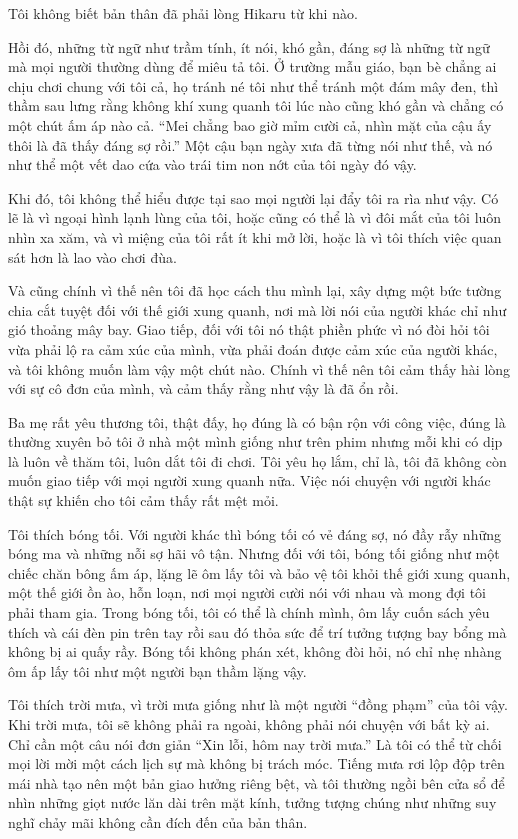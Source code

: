 {Tôi không biết bản thân đã phải lòng Hikaru từ khi nào.

Hồi đó, những từ ngữ như trầm tính, ít nói, khó gần, đáng sợ là những từ
ngữ mà mọi người thường dùng để miêu tả tôi. Ở trường mẫu giáo, bạn bè
chẳng ai chịu chơi chung với tôi cả, họ tránh né tôi như thể tránh một
đám mây đen, thì thầm sau lưng rằng không khí xung quanh tôi lúc nào
cũng khó gần và chẳng có một chút ấm áp nào cả. ``Mei chẳng bao giờ mỉm
cười cả, nhìn mặt của cậu ấy thôi là đã thấy đáng sợ rồi.'' Một cậu bạn
ngày xưa đã từng nói như thế, và nó như thể một vết dao cứa vào trái tim
non nớt của tôi ngày đó vậy.

Khi đó, tôi không thể hiểu được tại sao mọi người lại đẩy tôi ra rìa như
vậy. Có lẽ là vì ngoại hình lạnh lùng của tôi, hoặc cũng có thể là vì
đôi mắt của tôi luôn nhìn xa xăm, và vì miệng của tôi rất ít khi mở lời,
hoặc là vì tôi thích việc quan sát hơn là lao vào chơi đùa.

Và cũng chính vì thế nên tôi đã học cách thu mình lại, xây dựng một bức
tường chia cắt tuyệt đối với thế giới xung quanh, nơi mà lời nói của
người khác chỉ như gió thoảng mây bay. Giao tiếp, đối với tôi nó thật
phiền phức vì nó đòi hỏi tôi vừa phải lộ ra cảm xúc của mình, vừa phải
đoán được cảm xúc của người khác, và tôi không muốn làm vậy một chút
nào. Chính vì thế nên tôi cảm thấy hài lòng với sự cô đơn của mình, và
cảm thấy rằng như vậy là đã ổn rồi.

Ba mẹ rất yêu thương tôi, thật đấy, họ đúng là có bận rộn với công việc,
đúng là thường xuyên bỏ tôi ở nhà một mình giống như trên phim nhưng mỗi
khi có dịp là luôn về thăm tôi, luôn dắt tôi đi chơi. Tôi yêu họ lắm,
chỉ là, tôi đã không còn muốn giao tiếp với mọi người xung quanh nữa.
Việc nói chuyện với người khác thật sự khiến cho tôi cảm thấy rất mệt
mỏi.

Tôi thích bóng tối. Với người khác thì bóng tối có vẻ đáng sợ, nó đầy
rẫy những bóng ma và những nỗi sợ hãi vô tận. Nhưng đối với tôi, bóng
tối giống như một chiếc chăn bông ấm áp, lặng lẽ ôm lấy tôi và bảo vệ
tôi khỏi thế giới xung quanh, một thế giới ồn ào, hỗn loạn, nơi mọi
người cười nói với nhau và mong đợi tôi phải tham gia. Trong bóng tối,
tôi có thể là chính mình, ôm lấy cuốn sách yêu thích và cái đèn pin trên
tay rồi sau đó thỏa sức để trí tưởng tượng bay bổng mà không bị ai quấy
rầy. Bóng tối không phán xét, không đòi hỏi, nó chỉ nhẹ nhàng ôm ấp lấy
tôi như một người bạn thầm lặng vậy.

Tôi thích trời mưa, vì trời mưa giống như là một người ``đồng phạm'' của
tôi vậy. Khi trời mưa, tôi sẽ không phải ra ngoài, không phải nói chuyện
với bất kỳ ai. Chỉ cần một câu nói đơn giản ``Xin lỗi, hôm nay trời
mưa.'' Là tôi có thể từ chối mọi lời mời một cách lịch sự mà không bị
trách móc. Tiếng mưa rơi lộp độp trên mái nhà tạo nên một bản giao hưởng
riêng bệt, và tôi thường ngồi bên cửa sổ để nhìn những giọt nước lăn dài
trên mặt kính, tưởng tượng chúng như những suy nghĩ chảy mãi không cần
đích đến của bản thân.

}
